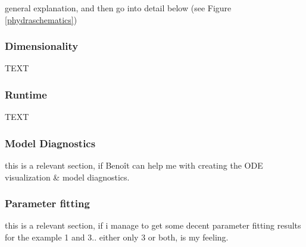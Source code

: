 \documentclass[journal abbreviation, manuscript]{copernicus}
\begin{document}
general explanation, and then go into detail below (see Figure \ref{phydraschematics})

\subsubsection{Dimensionality}
TEXT

\subsubsection{Runtime}
TEXT

\subsubsection{Model Diagnostics}
this is a relevant section, if Benoît can help me with creating the ODE visualization & model diagnostics.

\subsubsection{Parameter fitting}
this is a relevant section, if i manage to get some decent parameter fitting results for the example 1 and 3.. either only 3 or both, is my feeling. 
\end{document}
